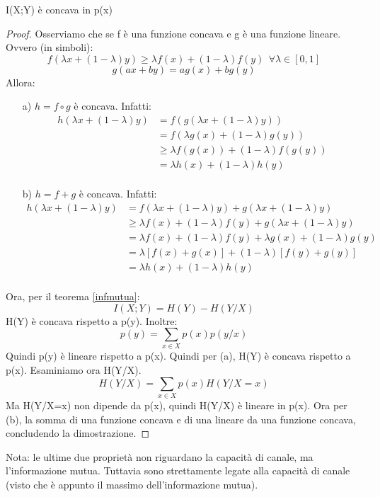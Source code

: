 \begin{osservazione}
\mbox{}

 I(X;Y) è concava in p(x)
\begin{proof}
\mbox{}

 \noindent
 Osserviamo che se f è una funzione concava e g è una funzione lineare. Ovvero (in simboli):
 \[
  f(\lambda x+(1-\lambda)y) \ge \lambda f(x)+ (1-\lambda) f(y) \ \ \forall \lambda \in [0,1]
 \]
 \[
  g(ax+by)=ag(x)+bg(y)
 \] 
  Allora:
  \begin{itemize}
   \item[a)] $h=f \circ g$ è concava. Infatti:
              \[\begin{split}
              h(\lambda x + (1-\lambda)y)&=f(g(\lambda x + (1-\lambda)y)) \\
              &=f(\lambda g(x) + (1-\lambda)g(y)) \\
              & \ge \lambda f(g(x)) + (1-\lambda)f(g(y)) \\
              &=\lambda h(x) + (1-\lambda)h(y) \\
               \end{split}
             \]

   \item[b)] $h=f+g$ è concava. Infatti:
              \[\begin{split}
                h(\lambda x + (1-\lambda)y)&=f(\lambda x + (1-\lambda)y)+g(\lambda x + (1-\lambda)y) \\
                &\ge \lambda f(x) + (1-\lambda)f(y)+g(\lambda x + (1-\lambda)y) \\
                &=\lambda f(x) + (1-\lambda)f(y)+ \lambda g(x) + (1-\lambda)g(y) \\
                &=\lambda[f(x)+g(x)] + (1-\lambda)[f(y)+g(y)] \\
                &=\lambda h(x) + (1-\lambda)h(y) \\
               \end{split}
              \]

  \end{itemize}
  Ora, per il teorema \ref{infmutua}:
  \[
   I(X;Y)=H(Y)-H(Y/X)
  \]
  H(Y) è concava rispetto a p(y). Inoltre:
  \[
   p(y)=\sum_{x \in X}p(x)p(y/x)
  \]
   Quindi p(y) è lineare rispetto a p(x). Quindi per (a), H(Y) è concava rispetto a p(x).
  Esaminiamo ora H(Y/X).
  \[
   H(Y/X)=\sum_{x \in X} p(x)H(Y/X=x)
  \]
   Ma H(Y/X=x) non dipende da p(x), quindi H(Y/X) è lineare in p(x).
   Ora per (b), la somma di una funzione concava e di una lineare da una funzione concava, concludendo la dimostrazione.
\end{proof}
\end{osservazione}
Nota: le ultime due proprietà non riguardano la capacità di canale, ma l'informazione mutua. Tuttavia sono strettamente legate alla 
capacità di canale (visto che è appunto il massimo dell'informazione mutua).

